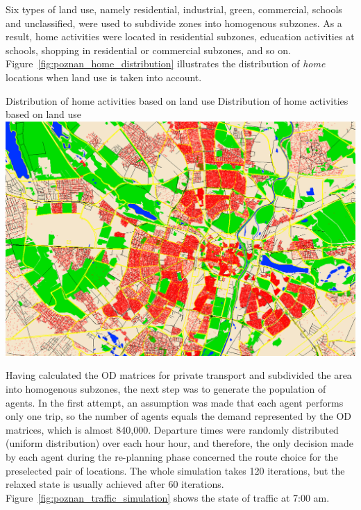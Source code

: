 Six types of land use, namely residential, industrial, green, commercial, schools and unclassified, were used to subdivide zones into homogenous subzones. As a result, home activities were located in residential subzones, education activities at schools, shopping in residential or commercial subzones, and so on. Figure~\ref{fig:poznan_home_distribution} illustrates the distribution of \emph{home} locations when land use is taken into account. 

\createfigure%
{Distribution of home activities based on land use}%
{Distribution of home activities based on land use}%
{\label{fig:poznan_home_distribution}}%
{\includegraphics[width=\textwidth, angle=0]{using/figures/poznan_home_distribution}}%
{}%

Having calculated the OD matrices for private transport and subdivided the area into homogenous subzones, the next step was to generate the population of agents. In the first attempt, an assumption was made that each agent performs only one trip, so the number of agents equals the demand represented by the OD matrices, which is almost 840,000. Departure times were randomly distributed (uniform distribution) over each hour hour, and therefore, the only decision made by each agent during the re-planning phase concerned the route choice for the preselected pair of locations. The whole simulation takes 120 iterations, but the relaxed state is usually achieved after 60 iterations. Figure~\ref{fig:poznan_traffic_simulation} shows the state of traffic at 7:00 am.


